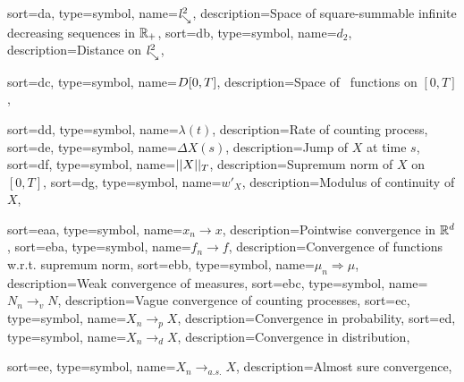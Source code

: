 {
	sort={da},
	type=symbol,
	name={$\mathit{l}^2_{\searrow}$},
	description={Space of square-summable infinite decreasing sequences in $\mathbb{R}_+$, \pageref{D: ld}}
}
{
	sort={db},
	type=symbol,
	name={$d_2$},
	description={Distance on $\mathit{l}^2_{\searrow}$, \pageref{D: ld}}
}

{
	sort={dc},
	type=symbol,
name={$D[0, T]$},
description={Space of \cadlag~functions on $[0,T]$, \pageref{D: DT}}
}

{
	sort={dd},
	type=symbol,
name={$\lambda(t)$},
description={Rate of counting process, \pageref{D: def gamma(A)}}
}
{
	sort={de},
	type=symbol,
name={$\Delta X(s)$},
description={Jump of $X$ at time $s$, \pageref{I: DeltaX}}
}
{
	sort={df},
	type=symbol,
name={$||X||_T$},
description={Supremum norm of $X$ on $[0,T]$, \pageref{I: supnorm}}
}
{
	sort={dg},
	type=symbol,
	name={$w'_X$},
	description={Modulus of continuity of $X$, \pageref{D: modulus of continuity}}
}



{
	sort={eaa},
	type=symbol,
	name={$x_n \rightarrow x$},
	description={Pointwise convergence in $\mathbb{R}^d$, \pageref{T: folk theorem}}
}
{
	sort={eba},
	type=symbol,
	name={$f_n \rightarrow f$},
	description={Convergence of functions w.r.t. supremum norm, \pageref{L: Deterministic Lemma}}
}
{
sort={ebb},
type=symbol,
name={$\mu_n \Rightarrow \mu$},
description={Weak convergence of measures, \pageref{D: weak convergence}}
}
{
sort={ebc},
type=symbol,
name={$N_n \rightarrow_v N$},
description={Vague convergence of counting processes, \pageref{D: vague convergence}}
}
{
	sort={ec},
	type=symbol,
	name={$X_n \rightarrow_p X$},
	description={Convergence in probability, \pageref{I: conv prob}}
}
{
	sort={ed},
	type=symbol,
	name={$X_n \rightarrow_d X$},
	description={Convergence in distribution, \pageref{D: weak convergence}}
}

{
	sort={ee},
	type=symbol,
	name={$X_n \rightarrow_{a.s.} X$},
	description={Almost sure convergence, \pageref{I: conv as}}
}
